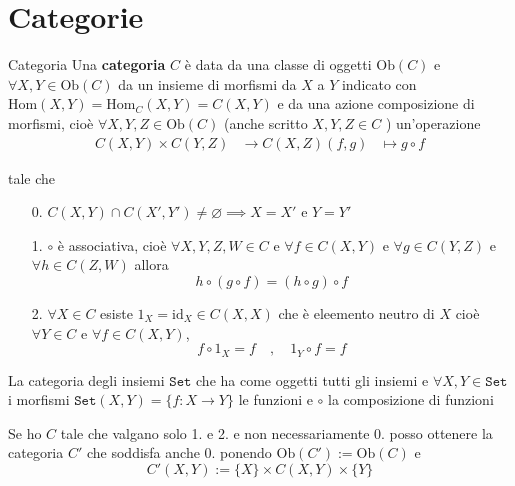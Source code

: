 \chapter{Categorie}

\begin{definition}{Categoria}
    Una \textbf{categoria} \(C\) è data da una classe di oggetti \(\mathrm{Ob}{(C)}\) e \(\forall X, Y \in \mathrm{Ob}{(C)}\) da un insieme di morfismi da \(X \) a \(Y\) indicato con
    \(\mathrm{Hom}{(X,Y)} = \mathrm{Hom}_C {(X, Y)} = C{(X, Y)}\)  e da una
   azione  composizione di morfismi, cioè \(\forall X, Y, Z \in \mathrm{Ob}{(C)}\)
    (anche scritto \(X, Y, Z \in C\) ) un'operazione 
    \begin{align*}
        C{(X, Y)} \times  C{(Y, Z)} &\to  C{(X, Z)}
        {(f, g)} &\mapsto g \circ f
    \end{align*}

    tale che 
\begin{enumerate}[label = \arabic*.]
    \item[0.] \(C{(X,Y)} \cap  C{(X', Y')} \neq \varnothing \implies X = X' \text{ e } Y = Y'\) 
    \item[1.] \(\circ\) è associativa, cioè \(\forall X, Y, Z, W \in C\) e \(\forall f \in C{(X,Y)}\) e \(\forall g \in C{(Y, Z)}\) e \(\forall h \in C{(Z, W)}\)  allora 
        \[
          h \circ {(g \circ f)} = {(h \circ g)} \circ f
        \]
    \item[2.] \(\forall  X \in  C \) esiste \(1_X = \mathrm{id}_X \in C{(X, X)}\)
        che è eleemento neutro di \(X\) cioè \(\forall Y \in C\) e \(\forall f
        \in C{(X, Y)}\), 
        \[
          f \circ 1_X = f \quad, \quad 1_Y \circ f = f
        \]
\end{enumerate}
\end{definition}
\begin{example}{}
    La categoria degli insiemi \(\mathtt{Set} \) che ha come oggetti tutti gli
    insiemi e \(\forall X, Y \in \mathtt{Set} \) i morfismi \(\mathtt{Set}{(X, Y)} = \{f : X \to Y\}  \) le funzioni e \(\circ\) la composizione di funzioni
\end{example}
\begin{remark}{}
    Se ho \(C\) tale che valgano solo 1. e 2. e non necessariamente 0. posso
    ottenere la categoria \(C'\) che soddisfa anche 0. ponendo \(\mathrm{Ob}{(C')} := \mathrm{Ob}{(C)}\) e 
    \[
      C'{(X, Y)} := \{X\} \times C{(X,Y)} \times \{Y\} 
    \]
\end{remark}
